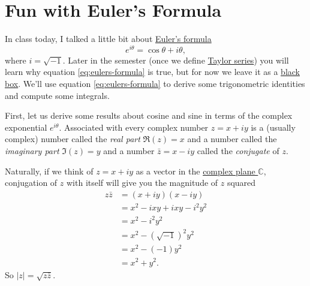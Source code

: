 \documentclass{amsart}
\theoremstyle{plain}
\theoremstyle{definition}
\newcommand{\bbC}{\mathbb{C}}
\begin{document}
\author{\href{mailto:\authoremail}{\documentauthor}}
\title{\documenttitle}
\date{\today}
\maketitle
\section{Fun with Euler's Formula}
In class today, I talked a little bit about
\href{https://en.wikipedia.org/wiki/Euler's_formula}{Euler's formula}
\begin{equation}
\label{eq:eulers-formula}
e^{i\theta}=\cos\theta+i\theta,
\end{equation}
where $i=\sqrt{-1}$. Later in the semester (once we define
\href{https://en.wikipedia.org/wiki/Taylor_series}{Taylor series}) you will
learn why equation \eqref{eq:eulers-formula} is true, but for now we leave it
as a \href{https://en.wikipedia.org/wiki/Black_box}{black box}. We'll use
equation \eqref{eq:eulers-formula} to derive some trigonometric identities
and compute some integrals.

First, let us derive some results about cosine and sine in terms of the
complex exponential $e^{i\theta}$. Associated with every complex number
$z=x+iy$ is a (usually complex) number called the \emph{real part}
$\Re(z)=x$ and a number called the \emph{imaginary part} $\Im(z)=y$ and a
number $\bar z=x-iy$ called the \emph{conjugate} of $z$.

Naturally, if we think of $z=x+iy$ as a vector in the
\href{https://en.wikipedia.org/wiki/Complex_plane}{complex plane $\bbC$},
conjugation of $z$ with itself will give you the magnitude of $z$ squared
\begin{align}
\label{eq:magnitude-square}
z\bar z&=(x+iy)(x-iy)\nonumber\\
       &=x^2-ixy+ixy-i^2y^2\nonumber\\
       &=x^2-i^2y^2\nonumber\\
       &=x^2-\left(\sqrt{-1}\right)^2y^2\nonumber\\
       &=x^2-(-1)y^2\nonumber\\
       &=x^2+y^2.
\end{align}
So $|z|=\sqrt{z\bar z}$.
\end{document}
